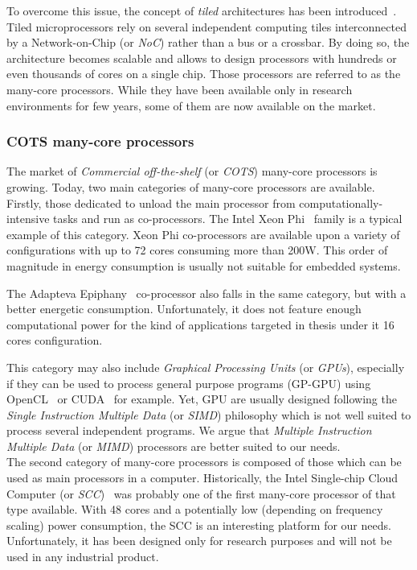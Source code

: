 \documentclass[main.tex]{subfiles}
\begin{document}
To overcome this issue, the concept of \emph{tiled} architectures has been
introduced~\cite{Taylor2007}. Tiled microprocessors rely on several independent
computing tiles interconnected by a Network-on-Chip (or \emph{NoC}) rather than
a bus or a crossbar. By doing so, the architecture becomes scalable and allows
to design processors with hundreds or even thousands of cores on a single chip.
Those processors are referred to as the many-core processors. While they have
been available only in research environments for few years, some of them are
now available on the market.



\subsubsection{COTS many-core processors}
The market of \emph{Commercial off-the-shelf} (or \emph{COTS}) many-core
processors is growing. Today, two main categories of many-core processors are
available. Firstly, those dedicated to unload the main processor from
computationally-intensive tasks and run as co-processors. The Intel Xeon
Phi~\cite{XeonPhi} family is a typical example of this category. Xeon Phi
co-processors are available upon a variety of configurations with up to 72
cores consuming more than 200W. This order of magnitude in energy consumption
is usually not suitable for embedded systems. 

The Adapteva Epiphany~\cite{Epiphany} co-processor also falls in the same
category, but with a better energetic consumption. Unfortunately, it does not
feature enough computational power for the kind of applications targeted in
thesis under it 16 cores configuration. 

This category may also include \emph{Graphical Processing Units} (or
\emph{GPUs}), especially if they can be used to process general purpose
programs (GP-GPU) using OpenCL~\cite{OpenCL} or CUDA~\cite{CUDA} for example.
Yet, GPU are usually designed following the \emph{Single Instruction Multiple
Data} (or \emph{SIMD}) philosophy which is not well suited to process several
independent programs. We argue that \emph{Multiple Instruction Multiple Data}
(or \emph{MIMD}) processors are better suited to our needs. \\


The second category of many-core processors is composed of those which can be
used as main processors in a computer. Historically, the Intel Single-chip
Cloud Computer (or \emph{SCC})~\cite{intel_scc} was probably one of the first
many-core processor of that type available. With 48 cores and a potentially low
(depending on frequency scaling) power consumption, the SCC is an interesting
platform for our needs. Unfortunately, it has been designed only for research
purposes and will not be used in any industrial product.
\end{document}
